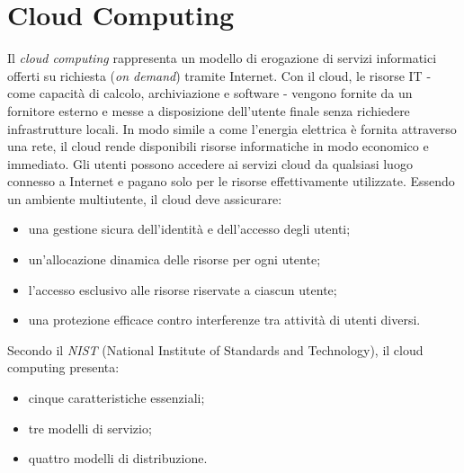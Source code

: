\documentclass[12pt]{report}
\begin{document}
	\chapter{Cloud Computing}
	Il \textit{cloud computing} rappresenta un modello di erogazione di servizi informatici offerti su richiesta (\textit{on demand}) tramite Internet. Con il cloud, le risorse IT - come capacità di calcolo, archiviazione e software - vengono fornite da un fornitore esterno e messe a disposizione dell’utente finale senza richiedere infrastrutture locali.
	In modo simile a come l'energia elettrica è fornita attraverso una rete, il cloud rende disponibili risorse informatiche in modo economico e immediato. Gli utenti possono accedere ai servizi cloud da qualsiasi luogo connesso a Internet e pagano solo per le risorse effettivamente utilizzate. 
	Essendo un ambiente multiutente, il cloud deve assicurare:
	\begin{itemize}
		\item una gestione sicura dell’identità e dell’accesso degli utenti;
		\item un’allocazione dinamica delle risorse per ogni utente;
		\item l’accesso esclusivo alle risorse riservate a ciascun utente;
		\item una protezione efficace contro interferenze tra attività di utenti diversi.
	\end{itemize}
	Secondo il \textit{NIST} (National Institute of Standards and Technology), il cloud computing presenta:
	\begin{itemize}
		\item cinque caratteristiche essenziali;
		\item tre modelli di servizio;
		\item quattro modelli di distribuzione.
	\end{itemize}
\end{document}

